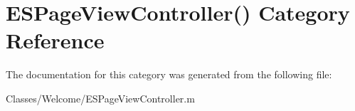 \hypertarget{category_e_s_page_view_controller_07_08}{}\section{E\+S\+Page\+View\+Controller() Category Reference}
\label{category_e_s_page_view_controller_07_08}


The documentation for this category was generated from the following file\+:\begin{DoxyCompactItemize}
\item 
Classes/\+Welcome/E\+S\+Page\+View\+Controller.\+m\end{DoxyCompactItemize}
